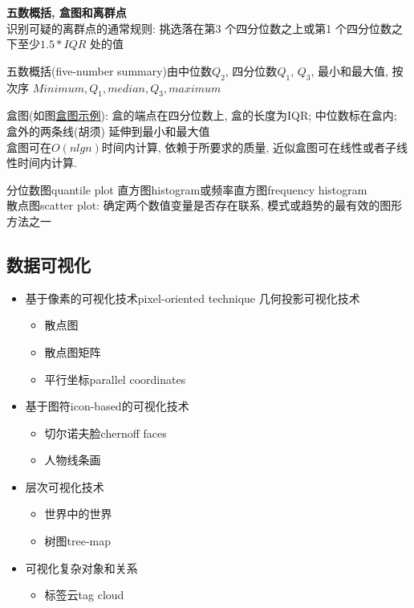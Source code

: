 \documentclass{article}
\begin{document}
\textbf{五数概括, 盒图和离群点}\\
识别可疑的离群点的通常规则: 挑选落在第3 个四分位数之上或第1 个四分位数之下至少$1.5 * IQR$ 处的值\par
五数概括(five-number summary)由中位数$Q_2$, 四分位数$Q_1$, $Q_3$, 最小和最大值, 按次序
$Minimum, Q_1, median, Q_3, maximum$\par
盒图(如图\href{http://i.imgbox.com/E7zYvy7e.jpg}{盒图示例}): 盒的端点在四分位数上, 盒的长度为IQR; 中位数标在盒内; 盒外的两条线(胡须) 延伸到最小和最大值\\

盒图可在$O(nlgn)$时间内计算, 依赖于所要求的质量, 近似盒图可在线性或者子线性时间内计算.

分位数图quantile plot
直方图histogram或频率直方图frequency histogram\\
散点图scatter plot: 确定两个数值变量是否存在联系, 模式或趋势的最有效的图形方法之一\\

\subsection{数据可视化}
\begin{itemize}
\item 基于像素的可视化技术pixel-oriented technique
几何投影可视化技术
	\begin{itemize}
	\item 散点图
	\item 散点图矩阵
    \item 平行坐标parallel coordinates
	\end{itemize}
\item 基于图符icon-based的可视化技术
	\begin{itemize}
	\item 切尔诺夫脸chernoff faces
	\item 人物线条画
	\end{itemize}
\item 层次可视化技术
	\begin{itemize}
	\item 世界中的世界
	\item 树图tree-map
	\end{itemize}
\item 可视化复杂对象和关系
	\begin{itemize}
	\item 标签云tag cloud
	\end{itemize}
\end{itemize}
	
\end{document}
